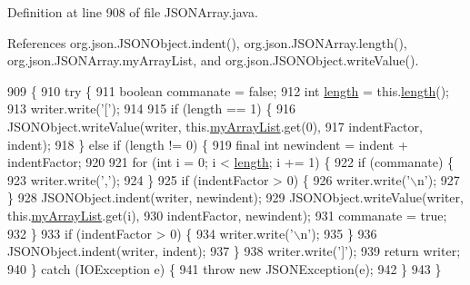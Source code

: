 Definition at line 908 of file J\-S\-O\-N\-Array.\-java.



References org.\-json.\-J\-S\-O\-N\-Object.\-indent(), org.\-json.\-J\-S\-O\-N\-Array.\-length(), org.\-json.\-J\-S\-O\-N\-Array.\-my\-Array\-List, and org.\-json.\-J\-S\-O\-N\-Object.\-write\-Value().


\begin{DoxyCode}
909                                  \{
910         \textcolor{keywordflow}{try} \{
911             \textcolor{keywordtype}{boolean} commanate = \textcolor{keyword}{false};
912             \textcolor{keywordtype}{int} \hyperlink{classorg_1_1json_1_1_j_s_o_n_array_a8382a78090007f650a02895ecbf3c8ec}{length} = this.\hyperlink{classorg_1_1json_1_1_j_s_o_n_array_a8382a78090007f650a02895ecbf3c8ec}{length}();
913             writer.write(\textcolor{charliteral}{'['});
914 
915             \textcolor{keywordflow}{if} (length == 1) \{
916                 JSONObject.writeValue(writer, this.\hyperlink{classorg_1_1json_1_1_j_s_o_n_array_a0ae87624145bd5bec5fca66d37a5e794}{myArrayList}.get(0),
917                         indentFactor, indent);
918             \} \textcolor{keywordflow}{else} \textcolor{keywordflow}{if} (length != 0) \{
919                 \textcolor{keyword}{final} \textcolor{keywordtype}{int} newindent = indent + indentFactor;
920 
921                 \textcolor{keywordflow}{for} (\textcolor{keywordtype}{int} i = 0; i < \hyperlink{classorg_1_1json_1_1_j_s_o_n_array_a8382a78090007f650a02895ecbf3c8ec}{length}; i += 1) \{
922                     \textcolor{keywordflow}{if} (commanate) \{
923                         writer.write(\textcolor{charliteral}{','});
924                     \}
925                     \textcolor{keywordflow}{if} (indentFactor > 0) \{
926                         writer.write(\textcolor{charliteral}{'\(\backslash\)n'});
927                     \}
928                     JSONObject.indent(writer, newindent);
929                     JSONObject.writeValue(writer, this.\hyperlink{classorg_1_1json_1_1_j_s_o_n_array_a0ae87624145bd5bec5fca66d37a5e794}{myArrayList}.get(i),
930                             indentFactor, newindent);
931                     commanate = \textcolor{keyword}{true};
932                 \}
933                 \textcolor{keywordflow}{if} (indentFactor > 0) \{
934                     writer.write(\textcolor{charliteral}{'\(\backslash\)n'});
935                 \}
936                 JSONObject.indent(writer, indent);
937             \}
938             writer.write(\textcolor{charliteral}{']'});
939             \textcolor{keywordflow}{return} writer;
940         \} \textcolor{keywordflow}{catch} (IOException e) \{
941             \textcolor{keywordflow}{throw} \textcolor{keyword}{new} JSONException(e);
942         \}
943     \}
\end{DoxyCode}


